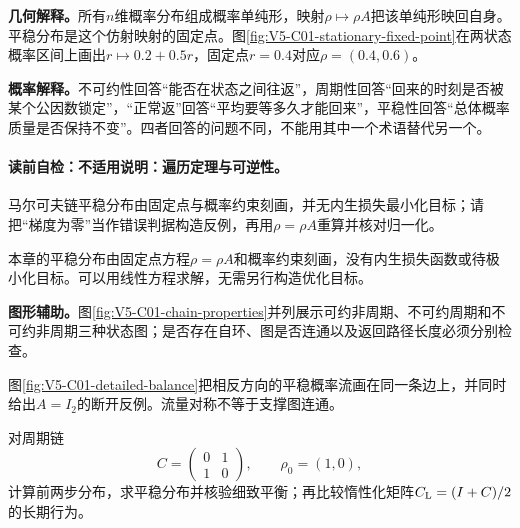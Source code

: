 \label{struct:V5-C01-CH14}
\textbf{几何解释。}所有$n$维概率分布组成概率单纯形，映射$\rho\mapsto\rho A$把该单纯形映回自身。平稳分布是这个仿射映射的固定点。图\ref{fig:V5-C01-stationary-fixed-point}在两状态概率区间上画出$r\mapsto0.2+0.5r$，固定点$r=0.4$对应$\rho=(0.4,0.6)$。


\label{struct:V5-C01-CH15}
\textbf{概率解释。}不可约性回答“能否在状态之间往返”，周期性回答“回来的时刻是否被某个公因数锁定”，“正常返”回答“平均要等多久才能回来”，平稳性回答“总体概率质量是否保持不变”。四者回答的问题不同，不能用其中一个术语替代另一个。

\label{struct:V5-C01-CH16}
\paragraph{读前自检：不适用说明：遍历定理与可逆性。}马尔可夫链平稳分布由固定点与概率约束刻画，并无内生损失最小化目标；请把“梯度为零”当作错误判据构造反例，再用$\rho=\rho A$重算并核对归一化。\par

\begin{notapplicablebox}[title=固定点视角]
本章的平稳分布由固定点方程$\rho=\rho A$和概率约束刻画，没有内生损失函数或待极小化目标。可以用线性方程求解，无需另行构造优化目标。
\end{notapplicablebox}

\label{struct:V5-C01-CH17}
\textbf{图形辅助。}图\ref{fig:V5-C01-chain-properties}并列展示可约非周期、不可约周期和不可约非周期三种状态图；是否存在自环、图是否连通以及返回路径长度必须分别检查。


图\ref{fig:V5-C01-detailed-balance}把相反方向的平稳概率流画在同一条边上，并同时给出$A=I_2$的断开反例。流量对称不等于支撑图连通。


\label{struct:V5-C01-CH18}
\begin{example}\label{exm:V5-C01-stationary-reversible}
对周期链
\[
C=\begin{pmatrix}0&1\\1&0\end{pmatrix},\qquad
\rho_0=(1,0),
\]
计算前两步分布，求平稳分布并核验细致平衡；再比较惰性化矩阵$C_{\rm L}=(I+C)/2$的长期行为。
\end{example}

